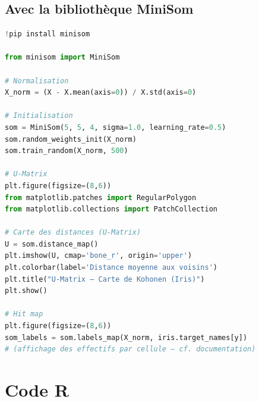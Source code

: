 \documentclass[a4paper,11pt]{article}
\theoremstyle{definition}
\begin{document}
\subsection{Avec la bibliothèque MiniSom}

\begin{lstlisting}[language=Python, caption=SOM avec MiniSom]
!pip install minisom

from minisom import MiniSom

# Normalisation
X_norm = (X - X.mean(axis=0)) / X.std(axis=0)

# Initialisation
som = MiniSom(5, 5, 4, sigma=1.0, learning_rate=0.5)
som.random_weights_init(X_norm)
som.train_random(X_norm, 500)

# U-Matrix
plt.figure(figsize=(8,6))
from matplotlib.patches import RegularPolygon
from matplotlib.collections import PatchCollection

# Carte des distances (U-Matrix)
U = som.distance_map()
plt.imshow(U, cmap='bone_r', origin='upper')
plt.colorbar(label='Distance moyenne aux voisins')
plt.title("U-Matrix — Carte de Kohonen (Iris)")
plt.show()

# Hit map
plt.figure(figsize=(8,6))
som_labels = som.labels_map(X_norm, iris.target_names[y])
# (affichage des effectifs par cellule — cf. documentation)
\end{lstlisting}

\section{Code R}
\end{document}
